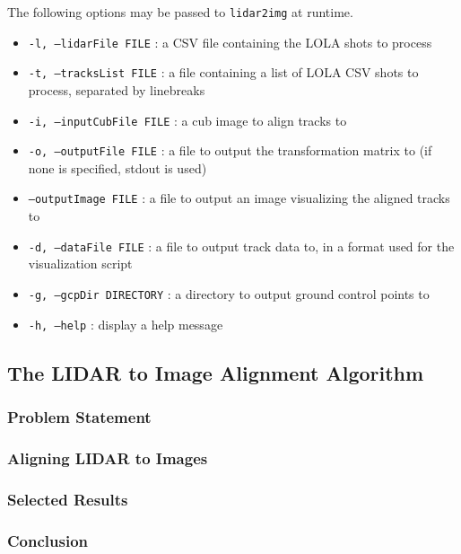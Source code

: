The following options may be passed to {\texttt{lidar2img}} at runtime.

\begin{itemize}
	\item{\texttt{-l, --lidarFile FILE}} : a CSV file containing the LOLA shots to process
	\item{\texttt{-t, --tracksList FILE}} : a file containing a list of LOLA CSV shots to process, separated by linebreaks
	\item{\texttt{-i, --inputCubFile FILE}} : a cub image to align tracks to
	\item{\texttt{-o, --outputFile FILE}} : a file to output the transformation matrix to (if none is specified, stdout is used)
	\item{\texttt{--outputImage FILE}} : a file to output an image visualizing the aligned tracks to
	\item{\texttt{-d, --dataFile FILE}} : a file to output track data to, in a format used for the visualization script
	\item{\texttt{-g, --gcpDir DIRECTORY}} : a directory to output ground control points to
	\item{\texttt{-h, --help}} : display a help message
\end{itemize}

\subsection{The LIDAR to Image Alignment Algorithm}


\subsubsection{Problem Statement}

\subsubsection{Aligning LIDAR to Images}

\subsubsection{Selected Results}

\subsubsection{Conclusion}


